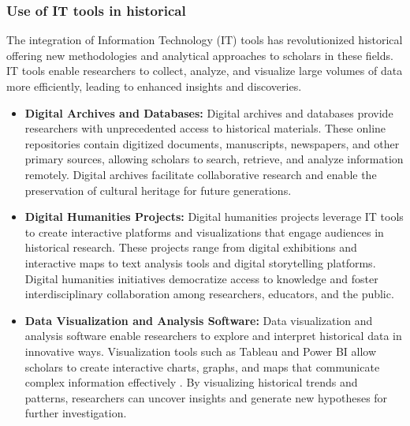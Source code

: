 \subsubsection{Use of IT tools in historical}
The integration of Information Technology (IT) tools has revolutionized historical offering new methodologies and analytical approaches to scholars in these fields. IT tools enable researchers to collect, analyze, and visualize large volumes of data more efficiently, leading to enhanced insights and discoveries.
\begin{itemize}
    \item \textbf{Digital Archives and Databases:}
    Digital archives and databases provide researchers with unprecedented access to historical materials. These online repositories contain digitized documents, manuscripts, newspapers, and other primary sources, allowing scholars to search, retrieve, and analyze information remotely. Digital archives facilitate collaborative research and enable the preservation of cultural heritage for future generations.
		\item \textbf{Digital Humanities Projects:}
		Digital humanities projects leverage IT tools to create interactive platforms and visualizations that engage audiences in historical research. These projects range from digital exhibitions and interactive maps to text analysis tools and digital storytelling platforms\cite{Bolstad}. Digital humanities initiatives democratize access to knowledge and foster interdisciplinary collaboration among researchers, educators, and the public.
		\item \textbf{Data Visualization and Analysis Software:}
        Data visualization and analysis software enable researchers to explore and interpret historical data in innovative ways. Visualization tools such as Tableau and Power BI allow scholars to create interactive charts, graphs, and maps that communicate complex information effectively \cite{Few}. By visualizing historical trends and patterns, researchers can uncover insights and generate new hypotheses for further investigation.
\end{itemize}
